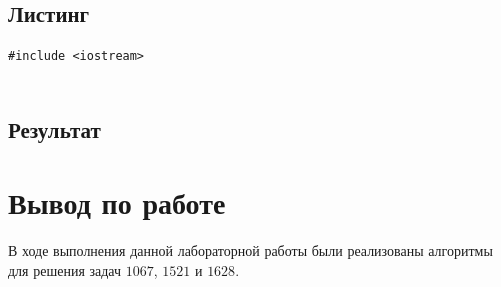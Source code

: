 \documentclass[a5paper, 10pt]{article}
\theoremstyle{definition}
\theoremstyle{plain}
\theoremstyle{remark}
\begin{document}
\subsection{Листинг}

\begin{center}
\begin{lstlisting}[label=some-code,caption={Исходный код для 1628}]
#include <iostream>


\end{lstlisting}
\end{center}

\subsection{Результат}



\newpage
\section{Вывод по работе}
В ходе выполнения данной лабораторной работы были реализованы алгоритмы для решения задач $1067$, $1521$ и $1628$. 
\end{document}
